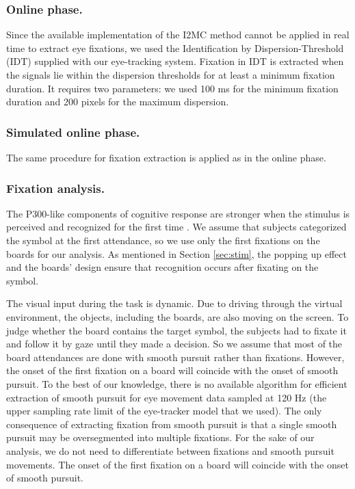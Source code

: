 \documentclass[12pt]{iopart}
\begin{document}
\subsubsection*{Online phase.}
Since the available implementation of the I2MC method cannot be applied 
in real time to extract eye fixations,
we used the Identification by Dispersion-Threshold (IDT) 
supplied with our eye-tracking system. Fixation in IDT is extracted
when the signals lie within the dispersion thresholds for at least a minimum fixation duration.
It requires two parameters: we used 100 ms for the minimum fixation duration
and 200 pixels for the maximum dispersion.

\subsubsection*{Simulated online phase.}
The same procedure for fixation extraction is applied as in the online phase.

\subsubsection*{Fixation analysis.}
\label{sec:fixanal}
The P300-like components of cognitive response are stronger when the stimulus is perceived and recognized
for the first time \cite{devillez_p300_2015}. 
We assume that subjects categorized the symbol at the first
attendance, so we use only the first fixations on the boards for our analysis.
As mentioned in Section \ref{sec:stim}, the popping up effect  
and the boards' design ensure that
recognition occurs after fixating on the symbol.

The visual input during the task is dynamic. Due to driving through
the virtual environment, the objects, including the boards, are also moving on the screen. To judge whether the board contains the target symbol, the subjects had to fixate it and follow it by gaze until they made a decision.
So we assume that most of the board attendances are done with
smooth pursuit rather than fixations. However, the onset of the first fixation on a board will coincide with the onset of smooth pursuit.
To the best of our knowledge, there is no available algorithm for efficient
extraction of smooth pursuit for eye movement data sampled at 120 Hz (the upper sampling rate limit of the eye-tracker model that we used). The only consequence of 
extracting fixation from smooth pursuit is that a single smooth pursuit
may be oversegmented into multiple fixations.
For the sake of our analysis, we do not need to differentiate between
fixations and smooth pursuit movements. The onset of the first fixation on a board
will coincide with the onset of smooth pursuit.
\end{document}
